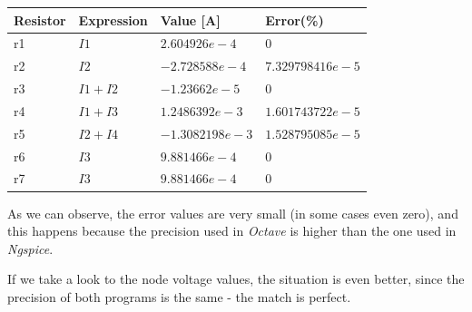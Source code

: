 \begin{table}[H]
\centering
\begin{tabularx}{0.8\textwidth} {
  | >{\raggedright\arraybackslash}X
  | >{\centering\arraybackslash}X
  | >{\centering\arraybackslash}X
  | >{\raggedleft\arraybackslash}X | }
 \hline
 Resistor & Expression & Value [A] & Error(\%)\\
 \hline
 r1 & $I1$ & $2.604926e-4$ & $0$ \\
 \hline
 r2 & $I2$ & $-2.728588e-4$ & $7.329798416e-5$ \\
 \hline
 r3 & $I1+I2$ & $-1.23662e-5$ & $0$ \\
 \hline
 r4 & $I1+I3$ & $1.2486392e-3$ & $1.601743722e-5$ \\
 \hline
 r5 & $I2+I4$ & $-1.3082198e-3$ & $1.528795085e-5$ \\
 \hline
 r6 & $I3$ & $9.881466e-4$ & $0$ \\
 \hline
 r7 & $I3$ & $9.881466e-4$ & $0$ \\
\hline
\end{tabularx}
\end{table}

\vspace{5mm}
\par As we can observe, the error values are very small (in some cases even zero), and this happens because the precision used in \emph{Octave} is higher than the one used in \emph{Ngspice}.
\par If we take a look to the node voltage values, the situation is even better, since the precision of both programs is the same - the match is perfect.
